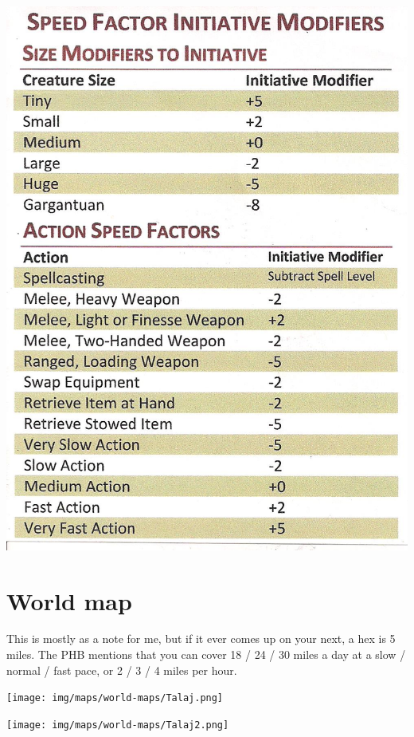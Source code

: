 \includegraphics{img/speed-factor-initiative.jpeg}

\section{World map}
This is mostly as a note for me, but if it ever comes up on your next, a hex is 5 miles.
The PHB mentions that you can cover 18 / 24 / 30 miles a day at a slow / normal / fast pace,
  or 2 / 3 / 4 miles per hour.


\texttt{[image: img/maps/world-maps/Talaj.png]}

\texttt{[image: img/maps/world-maps/Talaj2.png]}

